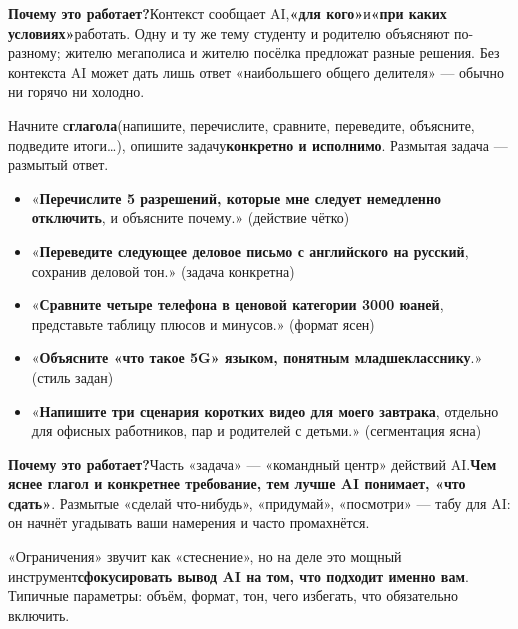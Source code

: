 \textbf{Почему это работает?}Контекст сообщает AI,\textbf{«для кого»}и\textbf{«при каких условиях»}работать. Одну и ту же тему студенту и родителю объясняют по-разному; жителю мегаполиса и жителю посёлка предложат разные решения. Без контекста AI может дать лишь ответ «наибольшего общего делителя» — обычно ни горячо ни холодно.


Начните с\textbf{глагола}(напишите, перечислите, сравните, переведите, объясните, подведите итоги…), опишите задачу\textbf{конкретно и исполнимо}. Размытая задача — размытый ответ.


\begin{itemize}
  \item «\textbf{Перечислите 5 разрешений, которые мне следует немедленно отключить}, и объясните почему.» (действие чётко)
  \item «\textbf{Переведите следующее деловое письмо с английского на русский}, сохранив деловой тон.» (задача конкретна)
  \item «\textbf{Сравните четыре телефона в ценовой категории 3000 юаней}, представьте таблицу плюсов и минусов.» (формат ясен)
  \item «\textbf{Объясните «что такое 5G» языком, понятным младшекласснику}.» (стиль задан)
  \item «\textbf{Напишите три сценария коротких видео для моего завтрака}, отдельно для офисных работников, пар и родителей с детьми.» (сегментация ясна)
\end{itemize}

\textbf{Почему это работает?}Часть «задача» — «командный центр» действий AI.\textbf{Чем яснее глагол и конкретнее требование, тем лучше AI понимает, «что сдать»}. Размытые «сделай что-нибудь», «придумай», «посмотри» — табу для AI: он начнёт угадывать ваши намерения и часто промахнётся.


«Ограничения» звучит как «стеснение», но на деле это мощный инструмент\textbf{сфокусировать вывод AI на том, что подходит именно вам}. Типичные параметры: объём, формат, тон, чего избегать, что обязательно включить.



